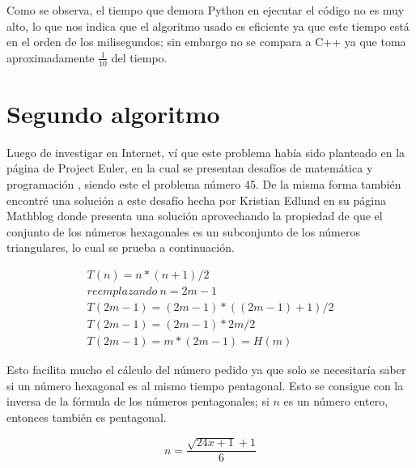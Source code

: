 \documentclass[12pt]{article}
\begin{document}
Como se observa, el tiempo que demora Python en ejecutar el código no es muy alto, lo que nos indica que el algoritmo usado
es eficiente ya que este tiempo está en el orden de los milisegundos; sin embargo no se compara a C++ ya que toma aproximadamente $ \frac{1}{10} $ del tiempo.

\section{Segundo algoritmo}
Luego de investigar en Internet, ví que este problema había sido planteado en la página de Project Euler, en la cual se
presentan desafíos de matemática y programación \cite{peuler}, siendo este el problema número 45. De la misma forma también
encontré una solución a este desafío hecha por Kristian Edlund en su página Mathblog \cite{kris} donde presenta una solución
aprovechando la propiedad de que el conjunto de los números hexagonales es un subconjunto de los números triangulares, lo cual
se prueba a continuación.

\begin{equation}
   \begin{gathered}
      T(n) = n * (n + 1) / 2\\
      reemplazando ~n = 2m - 1\\
      T(2m - 1) = (2m - 1) * ((2m - 1) + 1) / 2\\
      T(2m - 1) = (2m - 1) * 2m / 2\\
      T(2m - 1) = m * (2m - 1) = H(m)
   \end{gathered}
\end{equation}

Esto facilita mucho el cálculo del número pedido ya que solo se necesitaría saber si un número hexagonal es al mismo tiempo pentagonal. Esto se consigue con la inversa de la fórmula de los números pentagonales; si $ n $ es un número entero, entonces también es pentagonal.

\begin{equation}
   n = \frac{\sqrt{24x + 1} + 1}{6}
\end{equation}
\end{document}
